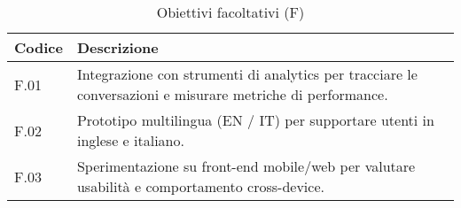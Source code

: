   \begin{table}[H]
    \centering
    \caption{Obiettivi facoltativi (F)}
    \begin{tabularx}{\textwidth}{@{}l X@{}}
      \toprule
      \textbf{Codice} & \textbf{Descrizione} \\
      \midrule
      F.01 & Integrazione con strumenti di analytics per tracciare le conversazioni e misurare metriche di performance. \\
      \midrule
      F.02 & Prototipo multilingua (EN / IT) per supportare utenti in inglese e italiano. \\
      \midrule
      F.03 & Sperimentazione su front-end mobile/web per valutare usabilità e comportamento cross-device. \\
      \bottomrule
    \end{tabularx}
  \end{table}

